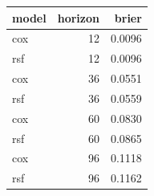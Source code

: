 \begin{tabular}{lrr}
\toprule
model & horizon & brier \\
\midrule
cox & 12 & 0.0096 \\
rsf & 12 & 0.0096 \\
cox & 36 & 0.0551 \\
rsf & 36 & 0.0559 \\
cox & 60 & 0.0830 \\
rsf & 60 & 0.0865 \\
cox & 96 & 0.1118 \\
rsf & 96 & 0.1162 \\
\bottomrule
\end{tabular}
